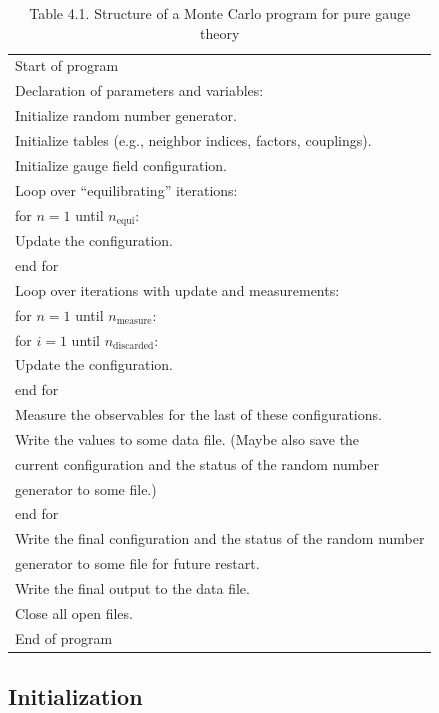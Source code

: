 \begin{table}[htbp]
  \centering
  \caption*{Table 4.1. Structure of a Monte Carlo program for pure gauge theory}
  \label{tab:41}
  \begin{tabular}{@{}p{}@{}}
    \ttfamily
    Start of program\\
    Declaration of parameters and variables:\\
    \quad Initialize random number generator.\\
    \quad Initialize tables (e.g., neighbor indices, factors, couplings).\\
    \quad Initialize gauge field configuration.\\
    Loop over ``equilibrating'' iterations:\\
    \quad for $n = 1$ until $n_\mathrm{equi}$:\\
    \quad\quad Update the configuration.\\
    \quad end for\\
    Loop over iterations with update and measurements:\\
    \quad for $n = 1$ until $n_\mathrm{measure}$:\\
    \quad\quad for $i = 1$ until $n_\mathrm{discarded}$:\\
    \quad\quad\quad Update the configuration.\\
    \quad\quad end for\\
    \quad\quad Measure the observables for the last of these configurations.\\
    \quad\quad Write the values to some data file. (Maybe also save the\\
    \quad\quad\quad current configuration and the status of the random number\\
    \quad\quad\quad generator to some file.)\\
    \quad end for\\
    Write the final configuration and the status of the random number\\
    \quad generator to some file for future restart.\\
    Write the final output to the data file.\\
    Close all open files.\\
    End of program
  \end{tabular}
\end{table}

\subsection{Initialization}

